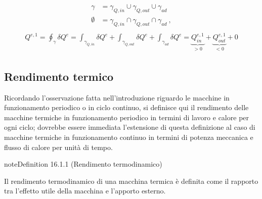\documentclass[letterpaper,10pt,italian]{jupyterBook}
\begin{document}
\begin{equation*}
\begin{split}\begin{aligned}
  \gamma & = \gamma_{Q,in} \cup \gamma_{Q,out} \cup \gamma_{ad} \\
  \emptyset & = \gamma_{Q,in} \cap \gamma_{Q,out} \cap \gamma_{ad} \ ,
\end{aligned}\end{split}
\end{equation*}\begin{equation*}
\begin{split}\begin{aligned}
  Q^{e,1} = \oint_{\gamma} \delta Q^{e} 
  = \int_{\gamma_{Q,in}} \delta Q^e + \int_{\gamma_{Q,out}} \delta Q^e + \int_{\gamma_{ad}} \delta Q^e 
  = \underbrace{Q^{e,1}_{in}}_{> 0} + \underbrace{Q^{e,1}_{out}}_{< 0} + 0
\end{aligned}\end{split}
\end{equation*}

\subsection{Rendimento termico}
\label{\detokenize{ch/thermodynamics/heat-engine-td-cycles:rendimento-termico}}\label{\detokenize{ch/thermodynamics/heat-engine-td-cycles:physics-hs-thermodynamics-heat-engine-td-cycles-efficiency}}
\sphinxAtStartPar
Ricordando l’osservazione fatta nell’introduzione riguardo le macchine in funzionamento periodico o in ciclo continuo, si definisce qui il rendimento delle macchine termiche in funzionamento periodico in termini di lavoro e calore per ogni ciclo; dovrebbe essere immediata l’estensione di questa definizione al caso di macchine termiche in funzionamento continuo in termini di potenza meccanica e flusso di calore per unità di tempo.
\label{ch/thermodynamics/heat-engine-td-cycles:definition-0}
\begin{sphinxadmonition}{note}{Definition 16.1.1 (Rendimento termodinamico)}



\sphinxAtStartPar
Il rendimento termodinamico di una macchina termica è definita come il rapporto tra l’effetto utile della macchina e l’apporto esterno.
\end{sphinxadmonition}
\end{document}
